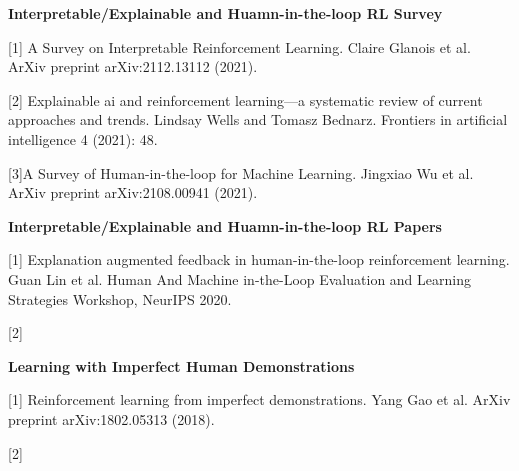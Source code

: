 \documentclass[twoside,11pt]{article}
\begin{document}
\textbf{Interpretable/Explainable and Huamn-in-the-loop RL Survey}

[1] A Survey on Interpretable Reinforcement Learning. Claire  Glanois et al. ArXiv preprint arXiv:2112.13112 (2021).

[2] Explainable ai and reinforcement learning—a systematic review of current approaches and trends. Lindsay Wells and Tomasz Bednarz. Frontiers in artificial intelligence 4 (2021): 48.

[3]A Survey of Human-in-the-loop for Machine Learning. Jingxiao Wu et al. ArXiv preprint arXiv:2108.00941 (2021).


\textbf{Interpretable/Explainable and Huamn-in-the-loop RL Papers}

[1] Explanation augmented feedback in human-in-the-loop reinforcement learning. Guan Lin et al. Human And Machine in-the-Loop Evaluation and Learning Strategies Workshop, NeurIPS 2020.

[2]

\textbf{Learning with Imperfect Human Demonstrations}

[1] Reinforcement learning from imperfect demonstrations. Yang Gao et al. ArXiv preprint arXiv:1802.05313 (2018).

[2]
\end{document}
